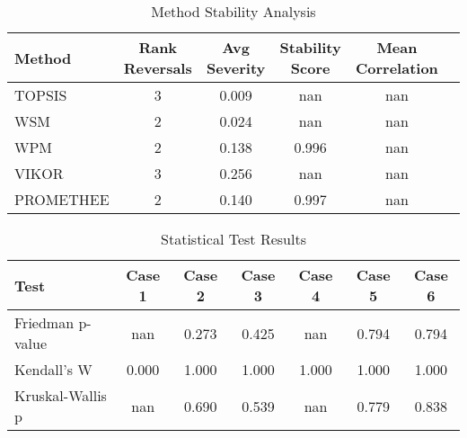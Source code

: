\begin{table}[htbp]
\centering
\caption{Method Stability Analysis}
\begin{tabular}{lccccc}
\hline
Method & Rank Reversals & Avg Severity & Stability Score & Mean Correlation \\
\hline
TOPSIS & 3 & 0.009 & nan & nan \\
WSM & 2 & 0.024 & nan & nan \\
WPM & 2 & 0.138 & 0.996 & nan \\
VIKOR & 3 & 0.256 & nan & nan \\
PROMETHEE & 2 & 0.140 & 0.997 & nan \\
\hline
\end{tabular}
\label{tab:stability}
\end{table}

\begin{table}[htbp]
\centering
\caption{Statistical Test Results}
\begin{tabular}{lcccccc}
\hline
Test & Case 1 & Case 2 & Case 3 & Case 4 & Case 5 & Case 6 \\
\hline
Friedman p-value & nan & 0.273 & 0.425 & nan & 0.794 & 0.794 \\
Kendall's W & 0.000 & 1.000 & 1.000 & 1.000 & 1.000 & 1.000 \\
Kruskal-Wallis p & nan & 0.690 & 0.539 & nan & 0.779 & 0.838 \\
\hline
\end{tabular}
\label{tab:statistics}
\end{table}
